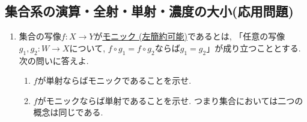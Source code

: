 \documentclass[dvipdfmx,a4paper,11pt]{article}
\theoremstyle{definition}
\begin{document}
 \newpage
 \begin{center}
\section{集合系の演算・全射・単射・濃度の大小(応用問題)}
\label{sec-2}
\end{center}
   \begin{enumerate}[label=\textbf{問}\ref*{sec-2}.\arabic*]
   \item 集合の写像$f : X \to Y$が\underline{モニック (左簡約可能)}であるとは, 「任意の写像$g_1, g_2 : W \to X$について, $f \circ g_1 = f \circ g_2$ならば$g_1=g_2$」が成り立つこととする.
次の問いに答えよ. 
   \begin{enumerate}[label=(\arabic*).]
 \setlength{\parskip}{0cm}
  \setlength{\itemsep}{0pt}
\item $f$が単射ならばモニックであることを示せ.
\item $f$がモニックならば単射であることを示せ. つまり集合においては二つの概念は同じである. 
\end{enumerate}


\end{enumerate}
\end{document}
